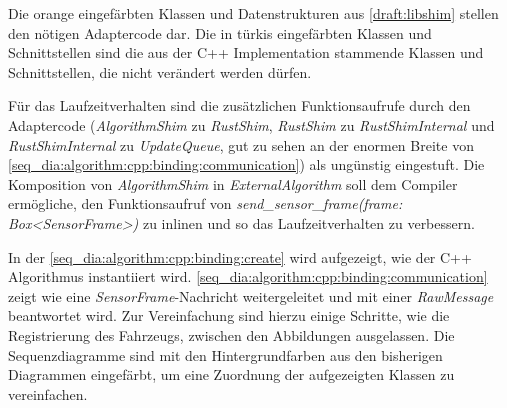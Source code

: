 Die orange eingefärbten Klassen und Datenstrukturen aus \autoref{draft:libshim} stellen den nötigen Adaptercode dar.
Die in türkis eingefärbten Klassen und Schnittstellen sind die aus der C++ Implementation stammende Klassen und Schnittstellen, die nicht verändert werden dürfen.

Für das Laufzeitverhalten sind die zusätzlichen Funktionsaufrufe durch den Adaptercode (\textit{AlgorithmShim} zu \textit{RustShim}, \textit{RustShim} zu \textit{RustShimInternal} und \textit{RustShimInternal} zu \textit{UpdateQueue}, gut zu sehen an der enormen Breite von \autoref{seq_dia:algorithm:cpp:binding:communication}) als ungünstig eingestuft.
Die Komposition von \textit{AlgorithmShim} in \textit{ExternalAlgorithm} soll dem Compiler ermögliche, den Funktionsaufruf von \textit{send\_sensor\_frame(frame: Box<SensorFrame>)} zu inlinen und so das Laufzeitverhalten zu verbessern.

In der \autoref{seq_dia:algorithm:cpp:binding:create} wird aufgezeigt, wie der C++ Algorithmus instantiiert wird.
\autoref{seq_dia:algorithm:cpp:binding:communication} zeigt wie eine \textit{SensorFrame}-Nachricht weitergeleitet und mit einer \textit{RawMessage} beantwortet wird.
Zur Vereinfachung sind hierzu einige Schritte, wie die Registrierung des Fahrzeugs, zwischen den Abbildungen ausgelassen.
Die Sequenzdiagramme sind mit den Hintergrundfarben aus den bisherigen Diagrammen eingefärbt, um eine Zuordnung der aufgezeigten Klassen zu vereinfachen.




